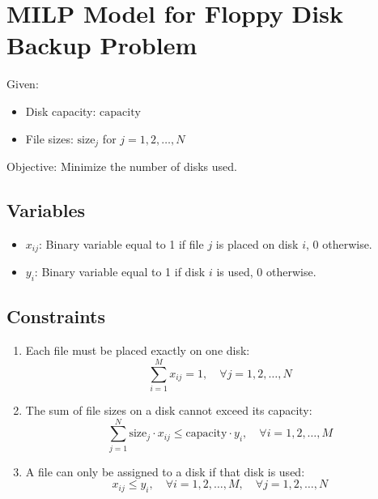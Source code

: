 \documentclass{article}
\begin{document}
\section*{MILP Model for Floppy Disk Backup Problem}

Given:
\begin{itemize}
    \item Disk capacity: \( \text{capacity} \)
    \item File sizes: \( \text{size}_j \) for \( j = 1, 2, \ldots, N \)
\end{itemize}

Objective: Minimize the number of disks used.

\subsection*{Variables}
\begin{itemize}
    \item \( x_{ij} \): Binary variable equal to 1 if file \( j \) is placed on disk \( i \), 0 otherwise.
    \item \( y_i \): Binary variable equal to 1 if disk \( i \) is used, 0 otherwise.
\end{itemize}

\subsection*{Constraints}
\begin{enumerate}
    \item Each file must be placed exactly on one disk:
    \begin{equation}
        \sum_{i=1}^{M} x_{ij} = 1, \quad \forall j = 1, 2, \ldots, N
    \end{equation}
    \item The sum of file sizes on a disk cannot exceed its capacity:
    \begin{equation}
        \sum_{j=1}^{N} \text{size}_j \cdot x_{ij} \leq \text{capacity} \cdot y_i, \quad \forall i = 1, 2, \ldots, M
    \end{equation}
    \item A file can only be assigned to a disk if that disk is used:
    \begin{equation}
        x_{ij} \leq y_i, \quad \forall i = 1, 2, \ldots, M, \quad \forall j = 1, 2, \ldots, N
    \end{equation}
\end{enumerate}
\end{document}
